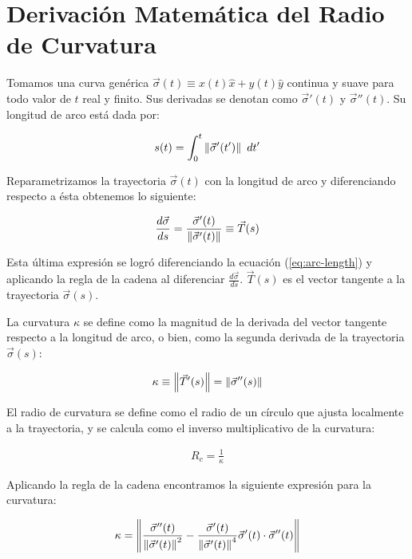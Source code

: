 \chapter{Derivación Matemática del Radio de Curvatura}
\label{app:math-curvature-radius}

Tomamos una curva genérica $\vec{\sigma}(t) \equiv x(t) \hat{x} + y(t) \hat{y}$ continua y suave para todo valor de $t$ real y finito. Sus derivadas se denotan como $\vec{\sigma}'(t)$ y $\vec{\sigma}''(t)$. Su longitud de arco está dada por:

\begin{align}
  s(t) = \int^t_0 \left\lVert\vec{\sigma}'(t')\right\rVert~dt' \label{eq:arc-length}
\end{align}

Reparametrizamos la trayectoria $\vec{\sigma}(t)$ con la longitud de arco y diferenciando respecto a ésta obtenemos lo siguiente:

\begin{align}
  \frac{d\vec{\sigma}}{ds} = \frac{\vec{\sigma}'(t)}{\left\lVert\vec{\sigma}'(t)\right\rVert} \equiv \vec{T}(s)
\end{align}

Esta última expresión se logró diferenciando la ecuación (\ref{eq:arc-length}) y aplicando la regla de la cadena al diferenciar $\frac{d\vec{\sigma}}{ds}$. $\vec{T}(s)$ es el vector tangente a la trayectoria $\vec{\sigma}(s)$.

La curvatura $\kappa$ se define como la magnitud de la derivada del vector tangente respecto a la longitud de arco, o bien, como la segunda derivada de la trayectoria $\vec{\sigma}(s)$:

\begin{align}
  \kappa \equiv \left\lVert\vec{T}'(s)\right\rVert = \left\lVert\vec{\sigma}''(s)\right\rVert 
\end{align}

El radio de curvatura se define como el radio de un círculo que ajusta localmente a la trayectoria, y se calcula como el inverso
multiplicativo de la curvatura:

\begin{align}
  R_c = \frac{1}{\kappa}
\end{align}

Aplicando la regla de la cadena encontramos la siguiente expresión para la curvatura:

\begin{align}
  \kappa = \left\lVert\frac{\vec{\sigma}''(t)}{\left\lVert\vec{\sigma}'(t)\right\rVert^2} - \frac{\vec{\sigma}'(t)}{\left\lVert\vec{\sigma}'(t)\right\rVert^4}
  \vec{\sigma}'(t)\cdot\vec{\sigma}''(t)\right\rVert \label{eq:curvature}
\end{align}

